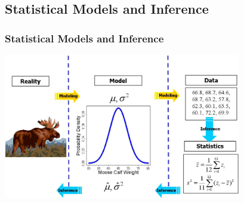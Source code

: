 \documentclass[mathserif,compress]{beamer}
\begin{document}
\subsection{Statistical Models and Inference}
\begin{frame} 
\frametitle{Statistical Models and Inference}
     
		\begin{center}
		  \vspace{-.5cm}
			\includegraphics[width=10.4cm]{statModInfer.jpeg} 
		\end{center} 
\end{frame}
\end{document}
